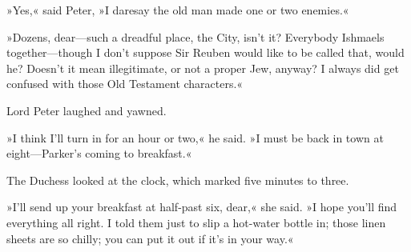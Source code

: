 »Yes,« said Peter, »I daresay the old man made one or two enemies.«

»Dozens, dear—such a dreadful place, the City, isn't it? Everybody Ishmaels together—though I don't suppose Sir Reuben would like to be called that, would he? Doesn't it mean illegitimate, or not a proper Jew, anyway? I always did get confused with those Old Testament characters.«

Lord Peter laughed and yawned.

»I think I'll turn in for an hour or two,« he said. »I must be back in town at eight—Parker's coming to breakfast.«

The Duchess looked at the clock, which marked five minutes to three.

»I'll send up your breakfast at half-past six, dear,« she said. »I hope you'll find everything all right. I told them just to slip a hot-water bottle in; those linen sheets are so chilly; you can put it out if it's in your way.«
